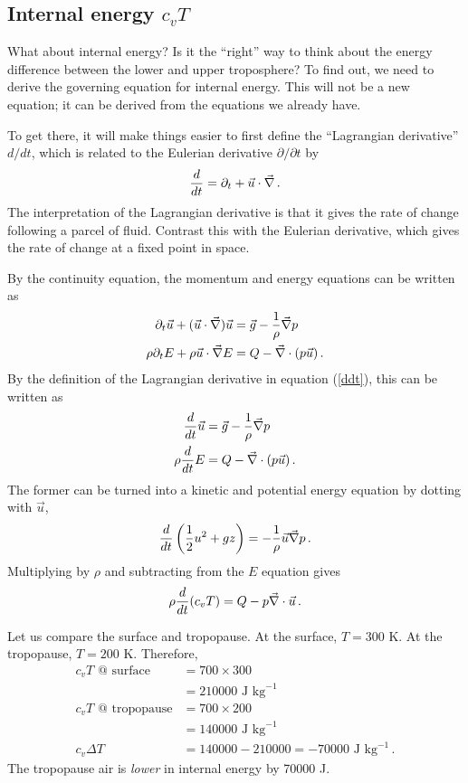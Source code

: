\documentclass[12pt]{article}
\begin{document}
\subsection{Internal energy $c_v T$}


What about internal energy?  Is it the ``right'' way to think about the energy difference between the lower and upper troposphere?  To find out, we need to derive the governing equation for internal energy.  This will not be a new equation; it can be derived from the equations we already have.


To get there, it will make things easier to first define the ``Lagrangian derivative'' $d/dt$, which is related to the Eulerian derivative $\partial/\partial t$ by
\begin{equation}
{\frac{d}{dt}} = \partial_t + \vec{u} \cdot {\vec{\nabla}} \, . \label{ddt}
\end{equation}
The interpretation of the Lagrangian derivative is that it gives the rate of change following a parcel of fluid.  Contrast this with the Eulerian derivative, which gives the rate of change at a fixed point in space.


By the continuity equation, the momentum and energy equations can be written as
\begin{align}
\partial_t \vec{u} + (\vec{u} \cdot {\vec{\nabla}}) \vec{u} &= \vec{g} - \frac{1}{\rho} {\vec{\nabla}} p \\
\rho \partial_t E + \rho \vec{u} \cdot {\vec{\nabla}} E &= Q - {\vec{\nabla}} \cdot (p \vec{u}) \, .
\end{align}
By the definition of the Lagrangian derivative in equation (\ref{ddt}), this can be written as
\begin{align}
\frac{d}{dt} \vec{u} &= \vec{g} - \frac{1}{\rho} {\vec{\nabla}} p \\
\rho \frac{d}{dt} E &= Q - {\vec{\nabla}} \cdot (p \vec{u}) \, .
\end{align}
The former can be turned into a kinetic and potential energy equation by dotting with $\vec{u}$,
\[
\frac{d}{dt} \left( \frac{1}{2} u^2 + gz \right) = - \frac{1}{\rho} \vec{u} {\vec{\nabla}} p \, .
\]
Multiplying by $\rho$ and subtracting from the $E$ equation gives
\begin{equation}
\rho \frac{d}{dt} (c_v T) = Q - p {\vec{\nabla}} \cdot \vec{u} \, . \label{internal}
\end{equation}


Let us compare the surface and tropopause.   At the surface, $T = 300$ K.  At the tropopause, $T = 200$ K.  Therefore,
\begin{align}
c_vT \text{ @ surface} &= 700 \times 300 \\
&= \num{210000} \text{ J kg}^{-1} \\
c_vT \text{ @ tropopause} &= 700 \times 200 \\
&= \num{140000} \text{ J kg}^{-1} \\
c_v \Delta T &= \num{140000} - \num{210000} = -\num{70000} \text{ J kg}^{-1} \, .
\end{align}
The tropopause air is {\it lower} in internal energy by \num{70000} J.
\end{document}
